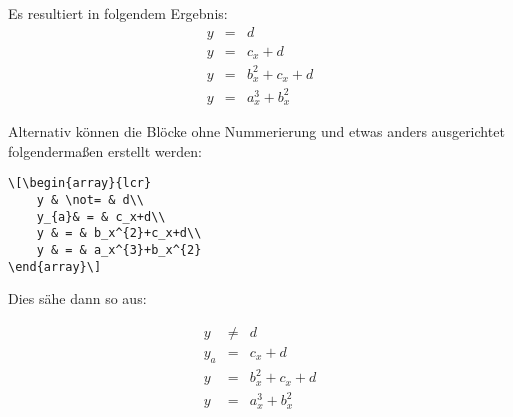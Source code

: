 Es resultiert in folgendem Ergebnis:
\begin{eqnarray}
    y & = & d\\
    y & = & c_x+d\\
    y & = & b_x^{2}+c_x+d\\
    y & = & a_x^{3}+b_x^{2}
\end{eqnarray}

Alternativ können die Blöcke ohne Nummerierung und etwas anders ausgerichtet folgendermaßen erstellt werden:
\begin{lstlisting}
\[\begin{array}{lcr}
    y & \not= & d\\
    y_{a}& = & c_x+d\\
    y & = & b_x^{2}+c_x+d\\
    y & = & a_x^{3}+b_x^{2}
\end{array}\]
\end{lstlisting}

Dies sähe dann so aus:

\[\begin{array}{lcr}
    y & \not= & d\\
    y_{a}& = & c_x+d\\
    y & = & b_x^{2}+c_x+d\\
    y & = & a_x^{3}+b_x^{2}
\end{array}\]